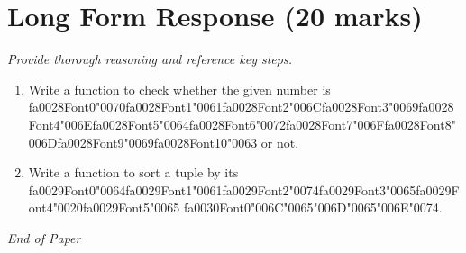 \documentclass[12pt]{article}
\begin{document}
\section*{Long Form Response (20 marks)}
\textit{Provide thorough reasoning and reference key steps.}
\begin{enumerate}[label=\arabic*.]
\item Write a function to check whether the given number is {\csname fa0028Font0\endcsname\char"0070}{\csname fa0028Font1\endcsname\char"0061}{\csname fa0028Font2\endcsname\char"006C}{\csname fa0028Font3\endcsname\char"0069}{\csname fa0028Font4\endcsname\char"006E}{\csname fa0028Font5\endcsname\char"0064}{\csname fa0028Font6\endcsname\char"0072}{\csname fa0028Font7\endcsname\char"006F}{\csname fa0028Font8\endcsname\char"006D}{\csname fa0028Font9\endcsname\char"0069}{\csname fa0028Font10\endcsname\char"0063} or not.
\item Write a function to sort a tuple by its {\csname fa0029Font0\endcsname\char"0064}{\csname fa0029Font1\endcsname\char"0061}{\csname fa0029Font2\endcsname\char"0074}{\csname fa0029Font3\endcsname\char"0065}{\csname fa0029Font4\endcsname\char"0020}{\csname fa0029Font5\endcsname\char"0065} {\csname fa0030Font0\endcsname\char"006C}{\char"0065}{\char"006D}{\char"0065}{\char"006E}{\char"0074}.
\end{enumerate}

\vfill
\noindent\textit{End of Paper}
\end{document}
